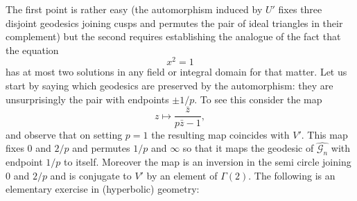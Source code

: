 \documentclass[12pt,a4paper]{amsart}
\def\g2{\Gamma(2)}
\def\gg{\mathcal{G}_n}
\begin{document}
The first point is rather easy 
(the automorphism induced by $U'$ fixes three disjoint geodesics joining 
cusps and permutes the pair of ideal triangles in their complement)
 but the second requires establishing
 the analogue of the fact that  the equation
$$x^2 = 1$$
has at most two solutions in any field or integral domain for that matter. 
Let us start by saying which geodesics are preserved 
by the automorphism: they are unsurprisingly the pair with endpoints $\pm 1/p$.
To see this consider the map
\begin{equation}
\label{inversion}
z \mapsto \frac{\bar{z}}{ p\bar{z} - 1},
\end{equation}
and observe that on setting $p=1$ the resulting map coincides with $V'$.
This map fixes $0$ and $2/p$ and permutes $1/p$ and $\infty$
 so that it maps the geodesic of $\hat{\gg}$ with endpoint $1/p$ to itself.
 Moreover the map  is an inversion in the semi circle joining $0$ and $2/p$  
and is conjugate to $V'$ by an element of $\g2$. 
The following is an elementary exercise in (hyperbolic) geometry:
\end{document}

